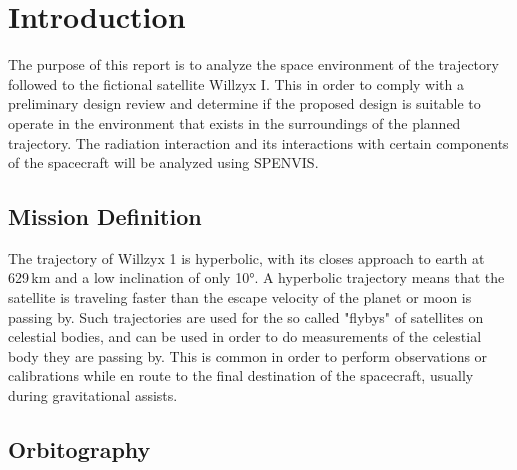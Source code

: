 
\section{\label{sec:intro}Introduction}

The purpose of this report is to analyze the space environment of the trajectory followed to the fictional satellite Willzyx I. This in order to comply with a preliminary design review and determine if the proposed design is suitable to operate in the environment that exists in the surroundings of the planned trajectory. The radiation interaction and its interactions with certain components of the spacecraft will be analyzed using SPENVIS.

\subsection{Mission Definition}

The trajectory of Willzyx 1 is hyperbolic, with its closes approach to earth at 629\,km and a low inclination of only \ang{10}. A hyperbolic trajectory means that the satellite is traveling faster than the escape velocity of the planet or moon is passing by. Such trajectories are used for the so called "flybys" of satellites on celestial bodies, and can be used in order to do measurements of the celestial body they are passing by. This is common in order to perform observations or calibrations while en route to the final destination of the spacecraft, usually during gravitational assists.

\subsection{Orbitography}

